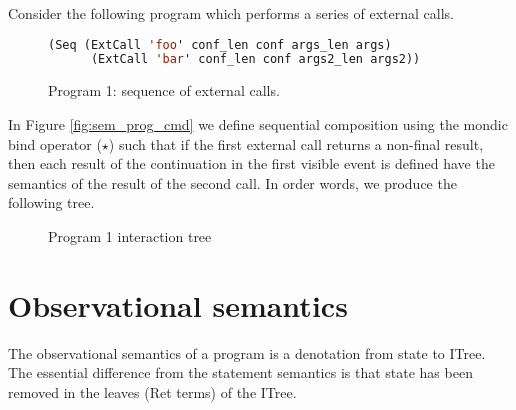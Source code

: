 \documentclass{article}
\begin{document}
Consider the following program which performs a series of external calls.

\begin{figure}[H]
  \centering
  \begin{lstlisting}[language=Lisp,basicstyle=\small]
    (Seq (ExtCall 'foo' conf_len conf args_len args)
      (ExtCall 'bar' conf_len conf args2_len args2))
  \end{lstlisting}
  \caption{Program 1: sequence of external calls.}
  \label{fig:prog1_seq_ffi}
\end{figure}

In Figure \ref{fig:sem_prog_cmd} we define sequential composition using the mondic bind operator ($\star$) such that if the first external call returns a non-final result, then each result of the continuation in the first visible event is defined have the semantics of the result of the second call. In order words, we produce the following tree.

\begin{figure}[H]
  \begin{adjustwidth}{-3cm}{0pt}
  \end{adjustwidth}
    \caption{Program 1 interaction tree}
  \label{fig:prog1_tree}
\end{figure}

\section{Observational semantics}
\label{sec:obs_sem}

The observational semantics of a program is a denotation from state to ITree. The essential difference from the statement semantics is that state has been removed in the leaves (Ret terms) of the ITree.
\end{document}
